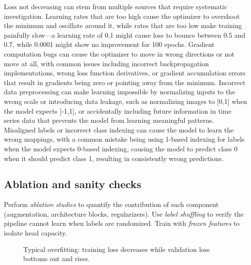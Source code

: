 Loss not decreasing can stem from multiple sources that require systematic investigation. Learning rates that are too high cause the optimizer to overshoot the minimum and oscillate around it, while rates that are too low make training painfully slow—a learning rate of 0.1 might cause loss to bounce between 0.5 and 0.7, while 0.0001 might show no improvement for 100 epochs. Gradient computation bugs can cause the optimizer to move in wrong directions or not move at all, with common issues including incorrect backpropagation implementations, wrong loss function derivatives, or gradient accumulation errors that result in gradients being zero or pointing away from the minimum. Incorrect data preprocessing can make learning impossible by normalizing inputs to the wrong scale or introducing data leakage, such as normalizing images to [0,1] when the model expects [-1,1], or accidentally including future information in time series data that prevents the model from learning meaningful patterns. Misaligned labels or incorrect class indexing can cause the model to learn the wrong mappings, with a common mistake being using 1-based indexing for labels when the model expects 0-based indexing, causing the model to predict class 0 when it should predict class 1, resulting in consistently wrong predictions.


\subsection{Ablation and sanity checks}

Perform \emph{ablation studies}  to quantify the contribution of each component (augmentation, architecture blocks, regularizers). Use \emph{label shuffling} to verify the pipeline cannot learn when labels are randomized. Train with \emph{frozen features} to isolate head capacity.


\begin{figure}[h]
  \centering
  \caption{Typical overfitting: training loss decreases while validation loss bottoms out and rises.}
  \label{fig:overfit-curve}
\end{figure}


